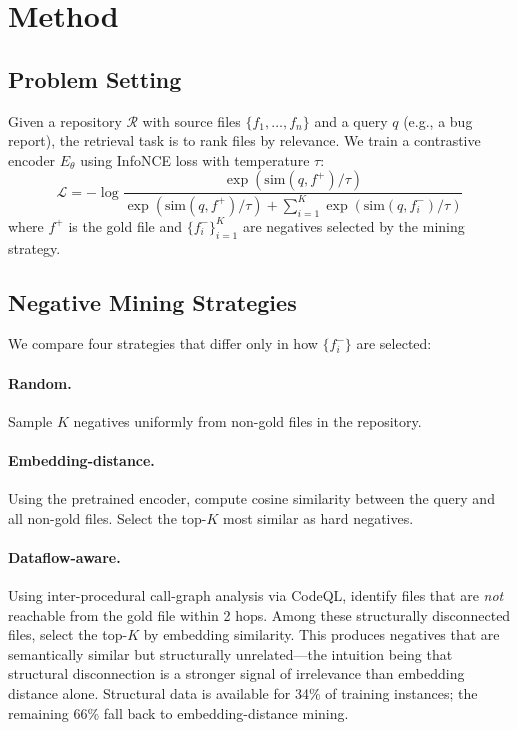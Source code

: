 \documentclass[11pt,a4paper]{article}
\begin{document}
\section{Method}
\label{sec:method}

\subsection{Problem Setting}

Given a repository $\mathcal{R}$ with source files $\{f_1, \ldots, f_n\}$ and a query $q$ (e.g., a bug report), the retrieval task is to rank files by relevance.
We train a contrastive encoder $E_\theta$ using InfoNCE loss with temperature $\tau$:
\begin{equation}
\mathcal{L} = -\log \frac{\exp(\text{sim}(q, f^+)/\tau)}{\exp(\text{sim}(q, f^+)/\tau) + \sum_{i=1}^{K} \exp(\text{sim}(q, f_i^-)/\tau)}
\end{equation}
where $f^+$ is the gold file and $\{f_i^-\}_{i=1}^K$ are negatives selected by the mining strategy.

\subsection{Negative Mining Strategies}

We compare four strategies that differ only in how $\{f_i^-\}$ are selected:

\paragraph{Random.} Sample $K$ negatives uniformly from non-gold files in the repository.

\paragraph{Embedding-distance.} Using the pretrained encoder, compute cosine similarity between the query and all non-gold files. Select the top-$K$ most similar as hard negatives.

\paragraph{Dataflow-aware.} Using inter-procedural call-graph analysis via CodeQL, identify files that are \emph{not} reachable from the gold file within 2 hops. Among these structurally disconnected files, select the top-$K$ by embedding similarity. This produces negatives that are semantically similar but structurally unrelated---the intuition being that structural disconnection is a stronger signal of irrelevance than embedding distance alone. Structural data is available for 34\% of training instances; the remaining 66\% fall back to embedding-distance mining.
\end{document}
